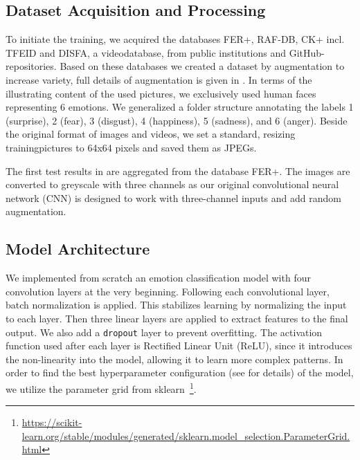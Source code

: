 \subsection{Dataset Acquisition and Processing}
\label{sec:datasets}
To initiate the training, 
we acquired the databases FER+, RAF-DB, CK+ incl. TFEID and DISFA, a videodatabase, from public institutions and GitHub-repositories.
Based on these databases we created a dataset by augmentation to increase variety, 
full details of augmentation is given in . 
In terms of the illustrating content of the used pictures, we exclusively used human faces representing 6 emotions. We generalized a folder structure annotating the labels 1 (surprise), 2 (fear), 3 (disgust), 4 (happiness), 5 (sadness), and 6 (anger). 
Beside the original format of images and videos, we set a standard, resizing trainingpictures to 64x64 pixels and saved them as JPEGs.

The first test results in  are aggregated from the database FER+. The images are converted to greyscale with three channels as our original convolutional neural network (CNN) is designed to work with three-channel inputs and add random augmentation. 

\subsection{Model Architecture}
We implemented from scratch an emotion classification model with four convolution layers at the very beginning. 
Following each convolutional layer, 
batch normalization is applied. 
This stabilizes learning by normalizing the input to each layer. 
Then three linear layers are applied to extract features to the final output. 
We also add a \texttt{dropout} layer to prevent overfitting. 
The activation function used after each layer is Rectified Linear Unit (ReLU), 
since it introduces the non-linearity into the model, 
allowing it to learn more complex patterns. 
In order to find the best hyperparameter configuration (see  for details) of the model, 
we utilize the parameter grid from sklearn~\footnote{\url{https://scikit-learn.org/stable/modules/generated/sklearn.model_selection.ParameterGrid.html}}. 


